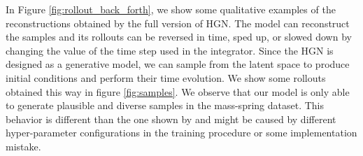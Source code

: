 In Figure \ref{fig:rollout_back_forth}, we show some qualitative examples of the reconstructions obtained by the full version of HGN. The model can reconstruct the samples and its rollouts can be reversed in time, sped up, or slowed down by changing the value of the time step used in the integrator. Since the HGN is designed as a generative model, we can sample from the latent space to produce initial conditions and perform their time evolution. We show some rollouts obtained this way in figure \ref{fig:samples}. We observe that our model is only able to generate plausible and diverse samples in the mass-spring dataset.
This behavior is different than the one shown by \cite{hgn} and might be caused by different hyper-parameter configurations in the training procedure or some implementation mistake.





